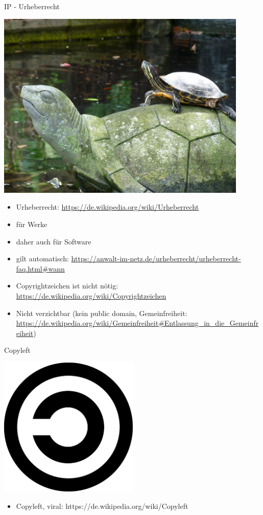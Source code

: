 \begin{frame}{IP - Urheberrecht}
	\begin{center}
		\includegraphics[width=0.9\textwidth]{res/turtles.jpg}
	\end{center}
\end{frame}
\note
{
	\begin{itemize}
		\item Urheberrecht: \url{https://de.wikipedia.org/wiki/Urheberrecht}
		\item für Werke
		\item daher auch für Software
		\item gilt automatisch: \url{https://anwalt-im-netz.de/urheberrecht/urheberrecht-faq.html\#wann}
		\item Copyrightzeichen ist nicht nötig: \url{https://de.wikipedia.org/wiki/Copyrightzeichen}
		\item Nicht verzichtbar (kein public domain, Gemeinfreiheit: \url{https://de.wikipedia.org/wiki/Gemeinfreiheit\#Entlassung\_in\_die\_Gemeinfreiheit})
	\end{itemize}
}


\begin{frame}{Copyleft}
	\begin{center}
		\includegraphics[width=0.5\textwidth]{res/copyleft.pdf}
	\end{center}
\end{frame}
\note
{
	\begin{itemize}
		\item Copyleft, viral: https://de.wikipedia.org/wiki/Copyleft
	\end{itemize}
}


